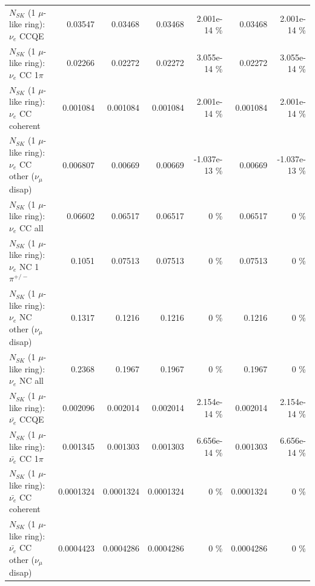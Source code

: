 \begin{table}
\begin{tabular}{| l | r | r | r  r | r  r |}
\hline
\hline
\hline
                                      $N_{SK}$ (1 $\mu$-like ring): $\nu_e$ CCQE &         0.03547 &         0.03468 &         0.03468 & 2.001e-14 \%  &         0.03468 & 2.001e-14 \%  \\ 
                                 $N_{SK}$ (1 $\mu$-like ring): $\nu_e$ CC 1$\pi$ &         0.02266 &         0.02272 &         0.02272 & 3.055e-14 \%  &         0.02272 & 3.055e-14 \%  \\ 
                               $N_{SK}$ (1 $\mu$-like ring): $\nu_e$ CC coherent &        0.001084 &        0.001084 &        0.001084 & 2.001e-14 \%  &        0.001084 & 2.001e-14 \%  \\ 
                $N_{SK}$ (1 $\mu$-like ring): $\nu_e$ CC other ($\nu_\mu$ disap) &        0.006807 &         0.00669 &         0.00669 & -1.037e-13 \%  &         0.00669 & -1.037e-13 \%  \\ 
                                  $N_{SK}$ (1 $\mu$-like ring): $\nu_{e}$ CC all &         0.06602 &         0.06517 &         0.06517 &        0 \%  &         0.06517 &        0 \%  \\ 
\hline
                           $N_{SK}$ (1 $\mu$-like ring): $\nu_e$ NC 1$\pi^{+/-}$ &          0.1051 &         0.07513 &         0.07513 &        0 \%  &         0.07513 &        0 \%  \\ 
                $N_{SK}$ (1 $\mu$-like ring): $\nu_e$ NC other ($\nu_\mu$ disap) &          0.1317 &          0.1216 &          0.1216 &        0 \%  &          0.1216 &        0 \%  \\ 
                                  $N_{SK}$ (1 $\mu$-like ring): $\nu_{e}$ NC all &          0.2368 &          0.1967 &          0.1967 &        0 \%  &          0.1967 &        0 \%  \\ 
\hline
\hline
\hline
                                $N_{SK}$ (1 $\mu$-like ring): $\bar{\nu_e}$ CCQE &        0.002096 &        0.002014 &        0.002014 & 2.154e-14 \%  &        0.002014 & 2.154e-14 \%  \\ 
                           $N_{SK}$ (1 $\mu$-like ring): $\bar{\nu_e}$ CC 1$\pi$ &        0.001345 &        0.001303 &        0.001303 & 6.656e-14 \%  &        0.001303 & 6.656e-14 \%  \\ 
                         $N_{SK}$ (1 $\mu$-like ring): $\bar{\nu_e}$ CC coherent &       0.0001324 &       0.0001324 &       0.0001324 &        0 \%  &       0.0001324 &        0 \%  \\ 
          $N_{SK}$ (1 $\mu$-like ring): $\bar{\nu_e}$ CC other ($\nu_\mu$ disap) &       0.0004423 &       0.0004286 &       0.0004286 &        0 \%  &       0.0004286 &        0 \%  \\ 

\end{tabular}
\end{table}
